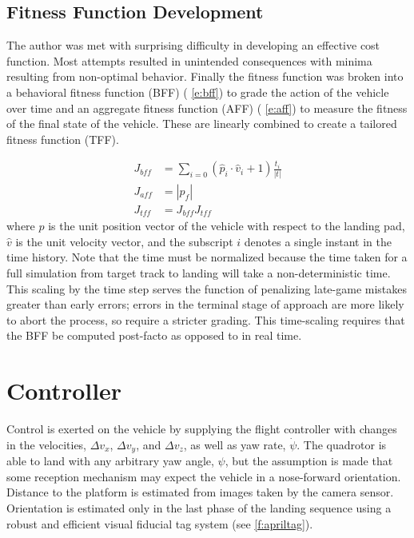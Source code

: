 \subsection{Fitness Function Development} The author was met with surprising difficulty in developing an
effective cost function. Most attempts resulted in unintended consequences with minima resulting from
non-optimal behavior. Finally the fitness function was broken into a behavioral fitness function (BFF) (
\cref{e:bff}) to grade the action of the vehicle over time and an aggregate fitness function (AFF) (
\cref{e:aff}) to measure the fitness of the final state of the vehicle. These are linearly combined to create
a tailored fitness function (TFF)\cite{divband2015effect}.

\begin{align}
J_{bff} &= \sum_{i=0}\left(\hat{p}_i\cdot\hat{v}_i + 1\right)\frac{t_i}{|t|} \label{e:bff}\\
    J_{aff} &= |p_f| \label{e:aff}\\
    J_{tff} &= J_{bff}J_{tff}\label{e:ff}
\end{align}
where $\hat{p}$ is the unit position vector of the vehicle with respect to the landing pad, $\hat{v}$ is the
unit velocity vector, and the subscript $i$ denotes a single instant in the time history. Note that the time
must be normalized because the time taken for a full simulation from target track to landing will take a
non-deterministic time. This scaling by the time step serves the function of penalizing late-game mistakes
greater than early errors; errors in the terminal stage of approach are more likely to abort the process, so
require a stricter grading. This time-scaling requires that the BFF be computed post-facto as opposed to in
real time.

\section{Controller}\label{s:landing:controller}
Control is exerted on the vehicle by supplying the flight controller with changes in the velocities, $\Delta
v_x$, $\Delta v_y$, and $\Delta v_z$, as well as yaw rate, $\dot{\psi}$. The quadrotor is able to land with
any arbitrary yaw angle, $\psi$, but the assumption is made that some reception mechanism may expect the
vehicle in a nose-forward orientation. Distance to the platform is estimated from images taken by the camera
sensor. Orientation is estimated only in the last phase of the landing sequence using a robust and efficient
visual fiducial tag system\cite{olson2011tags} (see \cref{f:apriltag}).

